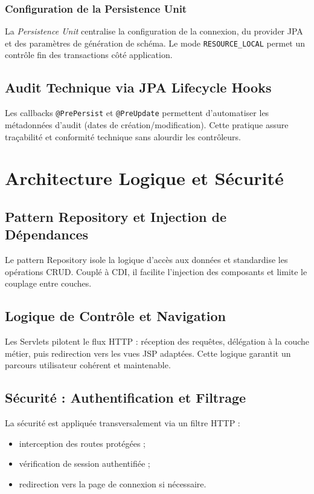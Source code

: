 \documentclass[12pt,a4paper]{report}
\begin{document}
\subsection{Configuration de la Persistence Unit}
La \textit{Persistence Unit} centralise la configuration de la connexion, du provider JPA et des paramètres de génération de schéma. Le mode \texttt{RESOURCE\_LOCAL} permet un contrôle fin des transactions côté application.

\section{Audit Technique via JPA Lifecycle Hooks}
Les callbacks \texttt{@PrePersist} et \texttt{@PreUpdate} permettent d'automatiser les métadonnées d'audit (dates de création/modification). Cette pratique assure traçabilité et conformité technique sans alourdir les contrôleurs.

\chapter{Architecture Logique et Sécurité}

\section{Pattern Repository et Injection de Dépendances}
Le pattern Repository isole la logique d'accès aux données et standardise les opérations CRUD. Couplé à CDI, il facilite l'injection des composants et limite le couplage entre couches.

\section{Logique de Contrôle et Navigation}
Les Servlets pilotent le flux HTTP : réception des requêtes, délégation à la couche métier, puis redirection vers les vues JSP adaptées. Cette logique garantit un parcours utilisateur cohérent et maintenable.

\section{Sécurité : Authentification et Filtrage}
La sécurité est appliquée transversalement via un filtre HTTP :
\begin{itemize}
    \item interception des routes protégées ;
    \item vérification de session authentifiée ;
    \item redirection vers la page de connexion si nécessaire.
\end{itemize}
\end{document}
